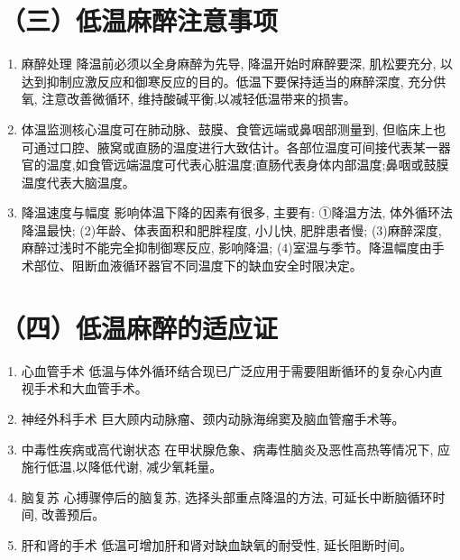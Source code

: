 \documentclass[10pt]{article}
\begin{document}
\section*{（三）低温麻醉注意事项}
\begin{enumerate}
  \item 麻醉处理 降温前必须以全身麻醉为先导, 降温开始时麻醉要深, 肌松要充分, 以达到抑制应激反应和御寒反应的目的。低温下要保持适当的麻醉深度, 充分供氧, 注意改善微循环, 维持酸碱平衡,以减轻低温带来的损害。

  \item 体温监测核心温度可在肺动脉、鼓膜、食管远端或鼻咽部测量到, 但临床上也可通过口腔、腋窝或直肠的温度进行大致估计。各部位温度可间接代表某一器官的温度,如食管远端温度可代表心脏温度;直肠代表身体内部温度;鼻咽或鼓膜温度代表大脑温度。

  \item 降温速度与幅度 影响体温下降的因素有很多, 主要有: ①降温方法, 体外循环法降温最快; (2)年龄、体表面积和肥胖程度, 小儿快, 肥胖患者慢; (3)麻醉深度, 麻醉过浅时不能完全抑制御寒反应, 影响降温; (4)室温与季节。降温幅度由手术部位、阻断血液循环器官不同温度下的缺血安全时限决定。

\end{enumerate}

\section*{（四）低温麻醉的适应证}
\begin{enumerate}
  \item 心血管手术 低温与体外循环结合现已广泛应用于需要阻断循环的复杂心内直视手术和大血管手术。

  \item 神经外科手术 巨大顾内动脉瘤、颈内动脉海绵窦及脑血管瘤手术等。

  \item 中毒性疾病或高代谢状态 在甲状腺危象、病毒性脑炎及恶性高热等情况下, 应施行低温,以降低代谢, 减少氧耗量。

  \item 脑复苏 心搏骤停后的脑复苏, 选择头部重点降温的方法, 可延长中断脑循环时间, 改善预后。

  \item 肝和肾的手术 低温可增加肝和肾对缺血缺氧的耐受性, 延长阻断时间。

\end{enumerate}
\end{document}
